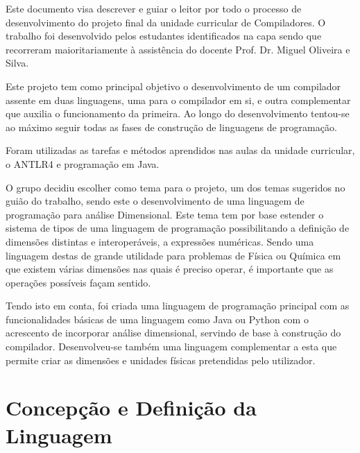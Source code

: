 \documentclass[10pt,portuguese]{article}
\begin{document}
\par Este documento visa descrever e guiar o leitor por todo o processo de desenvolvimento do projeto final da unidade curricular de Compiladores. O trabalho foi desenvolvido pelos estudantes identificados na capa sendo que recorreram maioritariamente à assistência do docente Prof. Dr. Miguel Oliveira e Silva.
\par Este projeto tem como principal objetivo o desenvolvimento de um compilador assente em duas linguagens, uma para o compilador em si, e outra complementar que auxilia o funcionamento da primeira. Ao longo do desenvolvimento tentou-se ao máximo seguir todas as fases de construção de linguagens de programação.
\par Foram utilizadas as tarefas e métodos aprendidos nas aulas da unidade curricular, o ANTLR4 e programação em Java.
\par O grupo decidiu escolher como tema para o projeto, um dos temas sugeridos no guião do trabalho, sendo este o desenvolvimento de uma linguagem de programação para análise Dimensional. Este tema tem por base estender o sistema de tipos de uma linguagem de programação possibilitando a definição de dimensões distintas e interoperáveis, a expressões numéricas. Sendo uma linguagem destas de grande utilidade para problemas de Física ou Química em que existem várias dimensões nas quais é preciso operar, é importante que as operações possíveis façam sentido.
\par Tendo isto em conta, foi criada uma linguagem de programação principal com as funcionalidades básicas de uma linguagem como Java ou Python com o acrescento de incorporar análise dimensional, servindo de base à construção do compilador. Desenvolveu-se também uma linguagem complementar a esta que permite criar as dimensões e unidades físicas pretendidas pelo utilizador.

\newpage
\section{Concepção e Definição da Linguagem}
\end{document}
